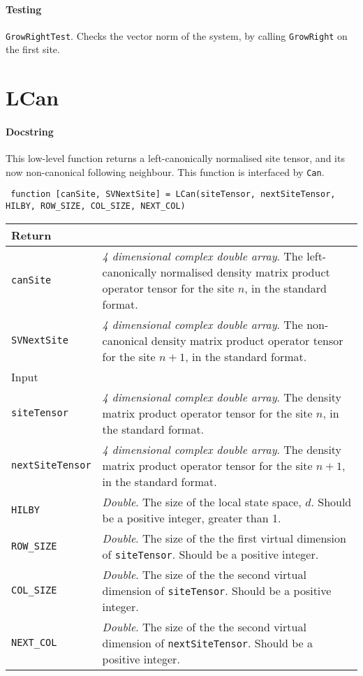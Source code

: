  \paragraph{Testing} \lstinline$GrowRightTest$. Checks the vector norm of the system, by calling \lstinline$GrowRight$ on the first site.

 \section{LCan}
 \paragraph{Docstring} This low-level function returns a left-canonically normalised site tensor, and its now non-canonical following neighbour. This function is interfaced by \lstinline$Can$.
 \begin{lstlisting}
 function [canSite, SVNextSite] = LCan(siteTensor, nextSiteTensor, HILBY, ROW_SIZE, COL_SIZE, NEXT_COL) \end{lstlisting}
 \begin{longtabu}{X[1,l]X[4,l]}
 \hline
 Return & \\ \hline
 \lstinline$canSite$ & \emph{4 dimensional complex double array}. The left-canonically normalised density matrix product operator tensor for the site \(n\), in the standard format. \\
 \lstinline$SVNextSite$ & \emph{4 dimensional complex double array}. The non-canonical density matrix product operator tensor for the site \(n+1\), in the standard format. \\ \hline
 Input & \\ \hline
 \lstinline$siteTensor$ & \emph{4 dimensional complex double array}. The density matrix product operator tensor for the site \(n\), in the standard format. \\
 \lstinline$nextSiteTensor$ & \emph{4 dimensional complex double array}. The density matrix product operator tensor for the site \(n+1\), in the standard format. \\
 \lstinline$HILBY$ & \emph{Double}. The size of the local state space, \(d\). Should be a positive integer, greater than 1. \\
 \lstinline$ROW_SIZE$ & \emph{Double}. The size of the the first virtual dimension of \lstinline$siteTensor$. Should be a positive integer.  \\
 \lstinline$COL_SIZE$ & \emph{Double}. The size of the the second virtual dimension of \lstinline$siteTensor$. Should be a positive integer. \\
 \lstinline$NEXT_COL$ & \emph{Double}. The size of the the second virtual dimension of \lstinline$nextSiteTensor$. Should be a positive integer. \\
 \hline
 \end{longtabu}
